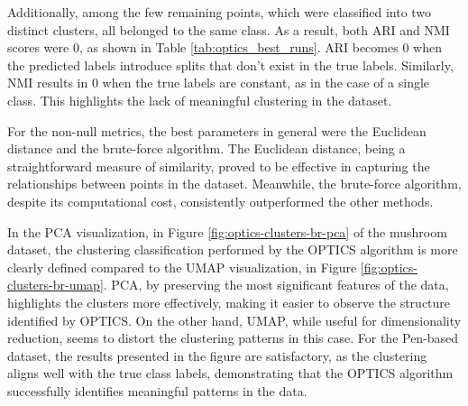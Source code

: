    Additionally, among the few remaining points, which were classified into two distinct clusters, all belonged to the same 
   class. As a result, both ARI and NMI scores were 0, as shown in Table \ref{tab:optics_best_runs}.
    ARI becomes 0 when the predicted labels introduce splits that don't exist in the true labels. Similarly, NMI results in 0 
	when the true labels are constant, as in the case of a single class. This highlights the lack of meaningful clustering in the dataset.



For the non-null metrics, the best parameters in general were the Euclidean distance and the brute-force algorithm. 
	The Euclidean distance, being a straightforward measure of similarity, proved to be effective in capturing the relationships
	 between points in the dataset. Meanwhile, the brute-force algorithm, despite its computational cost, consistently 
	 outperformed the other methods.


In the PCA visualization, in Figure \ref{fig:optics-clusters-br-pca} of the mushroom dataset, the clustering classification performed by the OPTICS algorithm is
 more clearly defined compared to the UMAP visualization, in Figure \ref{fig:optics-clusters-br-umap}. PCA, by preserving the most significant features of the data, 
 highlights the clusters more effectively, making it easier to observe the structure identified by OPTICS. On the other hand,
  UMAP, while useful for dimensionality reduction, seems to distort the clustering patterns in this case. For the Pen-based 
  dataset, the results presented in the figure are satisfactory, as the clustering aligns well with the true class labels, 
  demonstrating that the OPTICS algorithm successfully identifies meaningful patterns in the data.


